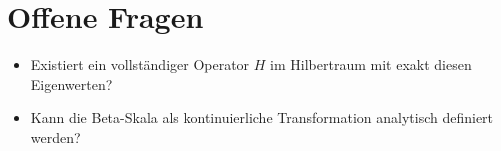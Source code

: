 \documentclass[a4paper,12pt]{article}
\begin{document}
\section*{Offene Fragen}
\begin{itemize}
    \item Existiert ein vollständiger Operator $H$ im Hilbertraum mit exakt diesen Eigenwerten?
    \item Kann die Beta-Skala als kontinuierliche Transformation analytisch definiert werden?
\end{itemize}
\end{document}
